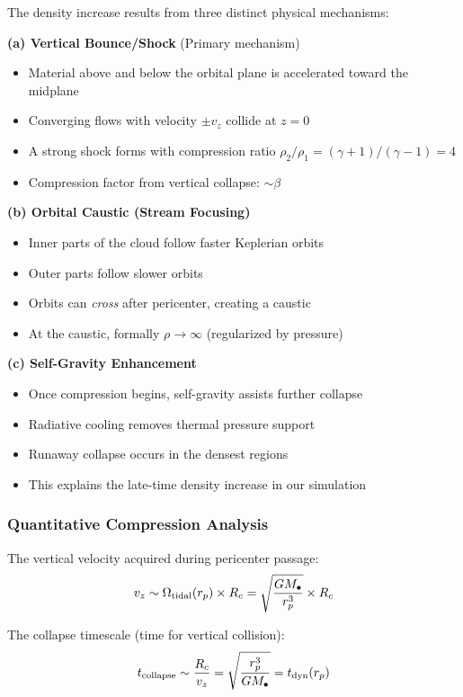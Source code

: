 \documentclass[twocolumn,amsmath,amssymb,prd,superscriptaddress,nofootinbib]{revtex4-2}
\begin{document}
The density increase results from three distinct physical mechanisms:

\textbf{(a) Vertical Bounce/Shock} (Primary mechanism)
\begin{itemize}
    \item Material above and below the orbital plane is accelerated toward the midplane
    \item Converging flows with velocity $\pm v_z$ collide at $z = 0$
    \item A strong shock forms with compression ratio $\rho_2/\rho_1 = (\gamma+1)/(\gamma-1) = 4$
    \item Compression factor from vertical collapse: $\sim\beta$
\end{itemize}

\textbf{(b) Orbital Caustic (Stream Focusing)}
\begin{itemize}
    \item Inner parts of the cloud follow faster Keplerian orbits
    \item Outer parts follow slower orbits
    \item Orbits can \textit{cross} after pericenter, creating a caustic
    \item At the caustic, formally $\rho \rightarrow \infty$ (regularized by pressure)
\end{itemize}

\textbf{(c) Self-Gravity Enhancement}
\begin{itemize}
    \item Once compression begins, self-gravity assists further collapse
    \item Radiative cooling removes thermal pressure support
    \item Runaway collapse occurs in the densest regions
    \item This explains the late-time density increase in our simulation
\end{itemize}

\subsubsection{Quantitative Compression Analysis}

The vertical velocity acquired during pericenter passage:
\begin{equation}
    v_z \sim \Omega_{\rm tidal}(r_p) \times R_c = \sqrt{\frac{GM_\bullet}{r_p^3}} \times R_c
\end{equation}

The collapse timescale (time for vertical collision):
\begin{equation}
    t_{\rm collapse} \sim \frac{R_c}{v_z} = \sqrt{\frac{r_p^3}{GM_\bullet}} = t_{\rm dyn}(r_p)
\end{equation}
\end{document}
